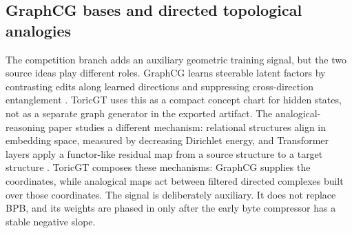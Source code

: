 \documentclass[11pt]{article}
\theoremstyle{definition}
\theoremstyle{plain}
\theoremstyle{remark}
\numberwithin{equation}{section}
\begin{document}
\subsection{GraphCG bases and directed topological analogies}

The competition branch adds an auxiliary geometric training signal, but the two source ideas play different roles.  GraphCG learns steerable latent factors by contrasting edits along learned directions and suppressing cross-direction entanglement \cite{liu2024graphcg}.  ToricGT uses this as a compact concept chart for hidden states, not as a separate graph generator in the exported artifact.  The analogical-reasoning paper studies a different mechanism: relational structures align in embedding space, measured by decreasing Dirichlet energy, and Transformer layers apply a functor-like residual map from a source structure to a target structure \cite{minegishi2026analogy}.  ToricGT composes these mechanisms: GraphCG supplies the coordinates, while analogical maps act between filtered directed complexes built over those coordinates.  The signal is deliberately auxiliary.  It does not replace BPB, and its weights are phased in only after the early byte compressor has a stable negative slope.
\end{document}
